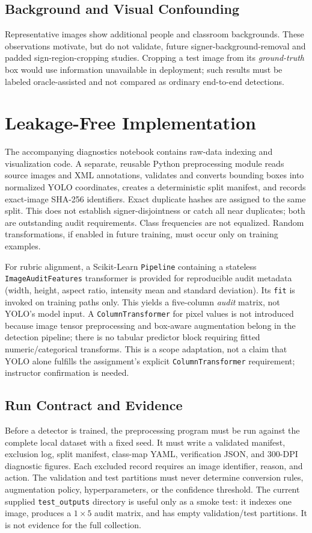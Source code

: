 \documentclass[conference]{IEEEtran}
\begin{document}
\subsection{Background and Visual Confounding}
Representative images show additional people and classroom backgrounds. These observations motivate, but do not validate, future signer-background-removal and padded sign-region-cropping studies. Cropping a test image from its \emph{ground-truth} box would use information unavailable in deployment; such results must be labeled oracle-assisted and not compared as ordinary end-to-end detections.
\section{Leakage-Free Implementation}
The accompanying diagnostics notebook contains raw-data indexing and visualization code. A separate, reusable Python preprocessing module reads source images and XML annotations, validates and converts bounding boxes into normalized YOLO coordinates, creates a deterministic split manifest, and records exact-image SHA-256 identifiers. Exact duplicate hashes are assigned to the same split. This does not establish signer-disjointness or catch all near duplicates; both are outstanding audit requirements. Class frequencies are not equalized. Random transformations, if enabled in future training, must occur only on training examples.
\par For rubric alignment, a Scikit-Learn \texttt{Pipeline} containing a stateless \texttt{ImageAuditFeatures} transformer is provided for reproducible audit metadata (width, height, aspect ratio, intensity mean and standard deviation). Its \texttt{fit} is invoked on training paths only. This yields a five-column \emph{audit} matrix, not YOLO's model input. A \texttt{ColumnTransformer} for pixel values is not introduced because image tensor preprocessing and box-aware augmentation belong in the detection pipeline; there is no tabular predictor block requiring fitted numeric/categorical transforms. This is a scope adaptation, not a claim that YOLO alone fulfills the assignment's explicit \texttt{ColumnTransformer} requirement; instructor confirmation is needed.

\subsection{Run Contract and Evidence}
Before a detector is trained, the preprocessing program must be run against the complete local dataset with a fixed seed. It must write a validated manifest, exclusion log, split manifest, class-map YAML, verification JSON, and 300-DPI diagnostic figures. Each excluded record requires an image identifier, reason, and action. The validation and test partitions must never determine conversion rules, augmentation policy, hyperparameters, or the confidence threshold. The current supplied \texttt{test\_outputs} directory is useful only as a smoke test: it indexes one image, produces a $1\times5$ audit matrix, and has empty validation/test partitions. It is not evidence for the full collection.
\end{document}
